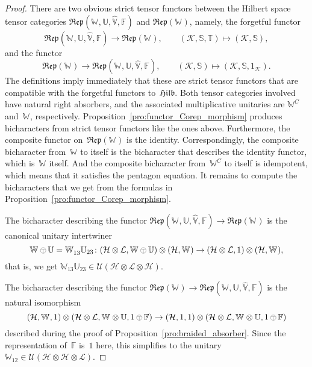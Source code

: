 \documentclass[a4paper]{amsart}
\numberwithin{equation}{section}
\theoremstyle{plain}
\numberwithin{theorem}{section}
\theoremstyle{definition}
\theoremstyle{remark}
\newcommand{\tenscorep}{\mathbin{\begin{tikzpicture}[baseline,x=.75ex,y=.75ex] \draw[line width=.2pt] (-0.8,1.15)--(0.8,1.15);\draw[line width=.2pt](0,-0.25)--(0,1.15); \draw[line width=.2pt] (0,0.75) circle [radius = 1];\end{tikzpicture}}}
\newcommand*{\Corep}[1]{\mathbb{#1}}          %
\newcommand*{\DuCorep}[1]{\hat{\Corep{#1}}}   %
\newcommand*{\Hilb}{\mathfrak{Hilb}}%
\newcommand*{\Corepcat}[1]{\mathfrak{Rep}(#1)}%
\newcommand*{\Multunit}[1][]{\mathbb W^{#1}}%
\newcommand*{\BrMultunit}{\mathbb F}%
\newcommand*{\Hils}[1][H]{\mathcal{#1}}%
\newcommand*{\U}{\mathcal U}%
\begin{document}
\begin{proof}
  There are two obvious strict tensor functors between the Hilbert
  space tensor categories
  \(\Corepcat{\Multunit,\Corep{U},\DuCorep{V},\BrMultunit}\)
  and \(\Corepcat{\Multunit}\), namely, the forgetful functor
  \[
  \Corepcat{\Multunit,\Corep{U},\DuCorep{V},\BrMultunit} \to
  \Corepcat{\Multunit},\qquad
  (\Hils[K],\Corep{S},\Corep{T}) \mapsto (\Hils[K],\Corep{S}),
  \]
  and the functor
  \[
  \Corepcat{\Multunit} \to
  \Corepcat{\Multunit,\Corep{U},\DuCorep{V},\BrMultunit},\qquad
  (\Hils[K],\Corep{S}) \mapsto (\Hils[K],\Corep{S},1_{\Hils[K]}).
  \]
  The definitions imply immediately that these are strict tensor
  functors that are compatible with the forgetful functors
  to~\(\Hilb\).
  Both tensor categories involved have natural right absorbers, and
  the associated multiplicative unitaries are \(\Multunit[C]\)
  and~\(\Multunit\),
  respectively.  Proposition~\ref{pro:functor_Corep_morphism} produces
  bicharacters from strict tensor functors like the ones above.
  Furthermore, the composite functor on~\(\Corepcat{\Multunit}\)
  is the identity.  Correspondingly, the composite bicharacter
  from~\(\Multunit\)
  to itself is the bicharacter that describes the identity functor,
  which is~\(\Multunit\)
  itself.  And the composite bicharacter from~\(\Multunit[C]\)
  to itself is idempotent, which means that it satisfies the pentagon
  equation.  It remains to compute the bicharacters that we
  get from the formulas in
  Proposition~\ref{pro:functor_Corep_morphism}.

  The bicharacter describing the functor
  \(\Corepcat{\Multunit,\Corep{U},\DuCorep{V},\BrMultunit} \to
  \Corepcat{\Multunit}\) is the canonical unitary intertwiner
  \[
  \Multunit\tenscorep\Corep{U} = \Multunit_{13}\Corep{U}_{23}\colon
  (\Hils\otimes\Hils[L], \Multunit\tenscorep\Corep{U}) \otimes
  (\Hils,\Multunit) \to
  (\Hils\otimes\Hils[L], 1) \otimes
  (\Hils,\Multunit),
  \]
  that is, we get
  \(\Multunit_{13}\Corep{U}_{23}\in
  \U(\Hils\otimes\Hils[L]\otimes\Hils)\).

  The bicharacter describing the functor
  \(\Corepcat{\Multunit} \to
  \Corepcat{\Multunit,\Corep{U},\DuCorep{V},\BrMultunit}\)
  is the natural isomorphism
  \[
  (\Hils,\Multunit,1) \otimes
  (\Hils\otimes\Hils[L],
  \Multunit\otimes\Corep{U},
  1\tenscorep\BrMultunit)
  \to
  (\Hils,1,1) \otimes
  (\Hils\otimes\Hils[L],
  \Multunit\otimes\Corep{U},
  1\tenscorep\BrMultunit)
  \]
  described during the proof of
  Proposition~\ref{pro:braided_absorber}.  Since the representation
  of~\(\BrMultunit\)
  is~\(1\) here,
  this simplifies to the unitary
  \(\Multunit_{12}\in \U(\Hils\otimes\Hils\otimes\Hils[L])\).


\end{proof}
\end{document}
